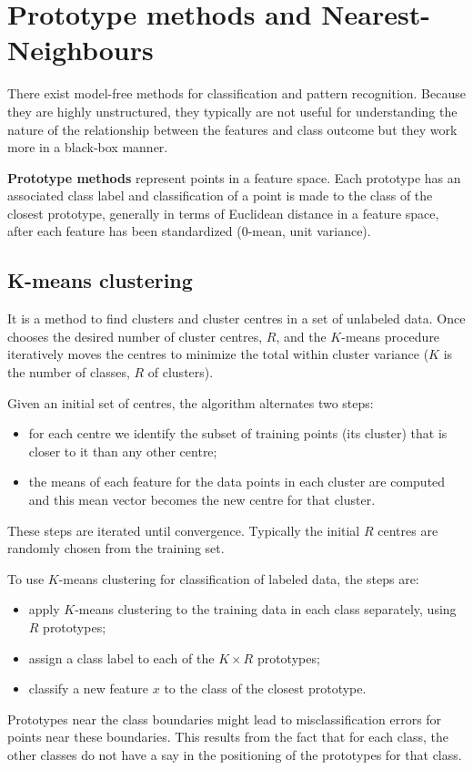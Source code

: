 \section{Prototype methods and Nearest-Neighbours}
There exist model-free methods for classification and pattern recognition. Because they are highly unstructured, they typically are not useful for understanding the nature of the relationship between the features and class outcome but they work more in a black-box manner.

\textbf{Prototype methods} represent points in a feature space. Each prototype has an associated class label and classification of a point is made to the class of the closest prototype, generally in terms of Euclidean distance in a feature space, after each feature has been standardized (0-mean, unit variance).

\subsection{K-means clustering}
It is a method to find clusters and cluster centres in a set of unlabeled data. Once chooses the desired number of cluster centres, $R$, and the $K$-means procedure iteratively moves the centres to minimize the total within cluster variance ($K$ is the number of classes, $R$ of clusters).

Given an initial set of centres, the algorithm alternates two steps:
\begin{itemize}
\item for each centre we identify the subset of training points (its cluster) that is closer to it than any other centre;
\item the means of each feature for the data points in each cluster are computed and this mean vector becomes the new centre for that cluster.
\end{itemize}
These steps are iterated until convergence. Typically the initial $R$ centres are randomly chosen from the training set.

To use $K$-means clustering for classification of labeled data, the steps are:
\begin{itemize}
\item apply $K$-means clustering to the training data in each class separately, using $R$ prototypes;
\item assign a class label to each of the $K \times R$ prototypes;
\item classify a new feature $x$ to the class of the closest prototype.
\end{itemize}
Prototypes near the class boundaries might lead to misclassification errors for points near these boundaries. This results from the fact that for each class, the other classes do not have a say in the positioning of the prototypes for that class.

